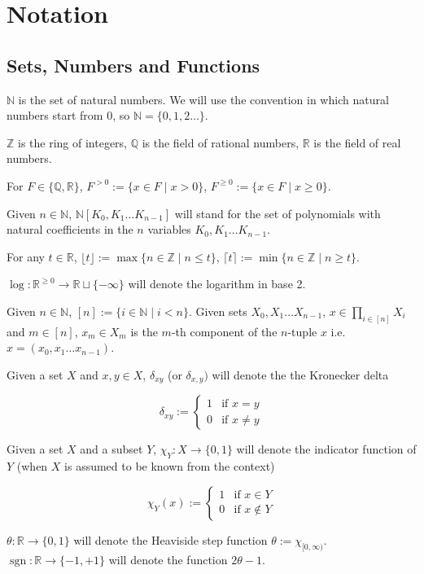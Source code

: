 \documentclass[11pt]{article}
\numberwithin{equation}{section}
\theoremstyle{definition}
\theoremstyle{plain}
\newcommand{\Bool}{\{0,1\}}
\DeclareMathOperator{\Sgn}{sgn}
\newcommand{\Nats}{\mathbb{N}}
\newcommand{\Ints}{\mathbb{Z}}
\newcommand{\Rats}{\mathbb{Q}}
\newcommand{\Reals}{\mathbb{R}}
\newcommand{\NatPoly}{\Nats[K_0, K_1 \ldots K_{n-1}]}
\newcommand{\Floor}[1]{\lfloor #1 \rfloor}
\newcommand{\Ceil}[1]{\lceil #1 \rceil}
\begin{document}
\section{Notation}
\label{sec:notation}
%
\subsection{Sets, Numbers and Functions}

$\Nats$ is the set of natural numbers. We will use the convention in which natural numbers start from 0, so $\Nats = \{0, 1, 2 \ldots \}$. 

$\Ints$ is the ring of integers, $\Rats$ is the field of rational numbers, $\Reals$ is the field of real numbers.

For $F \in \{\Rats,\Reals\}$, $F^{>0} := \{x \in F \mid x > 0\}$, $F^{\geq 0} := \{x \in F \mid x \geq 0\}$.

Given ${n \in \Nats}$, ${\NatPoly}$ will stand for the set of polynomials with natural coefficients in the ${n}$ variables ${K_0, K_1 \ldots K_{n-1}}$.

For any $t \in \Reals$, $\Floor{t} := \max \{n \in \Ints \mid n \leq t\}$, $\Ceil{t} := \min \{n \in \Ints \mid n \geq t\}$.

$\log: \Reals^{\geq 0} \rightarrow \Reals \sqcup \{-\infty\}$ will denote the logarithm in base 2.

Given $n \in \Nats$, $[n]:=\{i \in \Nats \mid i < n\}$. Given sets $X_0, X_1 \ldots X_{n-1}$, ${x \in \prod_{i \in [n]} X_i}$ and $m \in [n]$, $x_m \in X_m$ is the $m$-th component of the $n$-tuple $x$ i.e. ${x=(x_0, x_1 \ldots x_{n-1})}$.

Given a set $X$ and $x,y \in X$, $\delta_{xy}$ (or $\delta_{x,y})$ will denote the the Kronecker delta

$$\delta_{xy} := \begin{cases}1 & \text{if } x=y \\ 0 & \text{if } x \ne y \end{cases}$$

Given a set $X$ and a subset $Y$, $\chi_Y: X \rightarrow \Bool$ will denote the indicator function of $Y$ (when $X$ is assumed to be known from the context)

$$\chi_Y(x):=\begin{cases}1 & \text{if } x \in Y \\ 0 & \text{if } x \not\in Y \end{cases}$$

$\theta: \Reals \rightarrow \Bool$ will denote the Heaviside step function $\theta:=\chi_{[0,\infty)}$. ${\Sgn: \Reals \rightarrow \{-1,+1\}}$ will denote the function $2 \theta - 1$.
\end{document}
